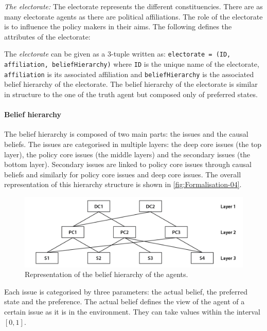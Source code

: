\documentclass[11pt]{article}
\begin{document}
\emph{The electorate: } The electorate represents the different constituencies. There are as many electorate agents as there are political affiliations. The role of the electorate is to influence the policy makers in their aims. The following defines the attributes of the electorate:

The \emph{electorate} can be given as a 3-tuple written as: \texttt{electorate = (ID, affiliation, beliefHierarchy)} where \texttt{ID} is the unique name of the electorate, \texttt{affiliation} is its associated affiliation and \texttt{beliefHierarchy} is the associated belief hierarchy of the electorate.  The belief hierarchy of the electorate is similar in structure to the one of the truth agent but composed only of preferred states.


\paragraph{Belief hierarchy}

The belief hierarchy is composed of two main parts: the issues and the causal beliefs. The issues are categorised in multiple layers: the deep core issues (the top layer), the policy core issues (the middle layers) and the secondary issues (the bottom layer). Secondary issues are linked to policy core issues through causal beliefs and similarly for policy core issues and deep core issues. The overall representation of this hierarchy structure is shown in \autoref{fig:Formalisation-04}.

\begin{figure}
\centering
\includegraphics[width = 0.95\linewidth, angle = 0]{figures/Formalisation-04}
\caption{Representation of the belief hierarchy of the agents.}
\label{fig:Formalisation-04}
\end{figure}

Each issue is categorised by three parameters: the actual belief, the preferred state and the preference. The actual belief defines the view of the agent of a certain issue as it is in the environment. They can take values within the interval $[0, 1]$.
\end{document}
